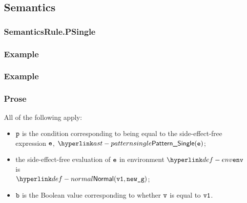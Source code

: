 \begin{mathpar}
\end{mathpar}

\subsection{Semantics}
\subsubsection{SemanticsRule.PSingle \label{sec:SemanticsRule.PSingle}}
\subsubsection{Example}

\subsubsection{Example}

\subsubsection{Prose}
All of the following apply:
\begin{itemize}
  \item $\vp$ is the condition corresponding to being equal to the
    side-effect-free expression $\ve$, $\PatternSingle(\ve)$;
  \item the side-effect-free evaluation of $\ve$ in
    environment $\env$ is \\ $\Normal(\vvone, \newg)$\ProseOrError;
  \item $\vb$ is the Boolean value corresponding to whether $\vv$
    is equal to $\vvone$.
\end{itemize}

